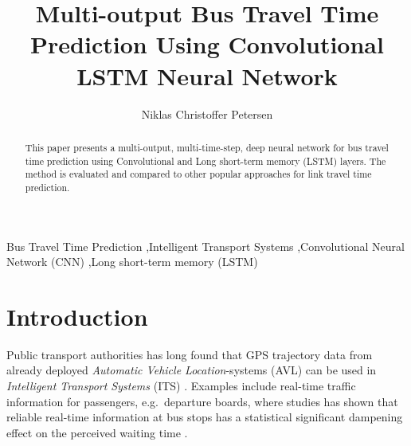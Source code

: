 \documentclass[preprint,12pt]{elsarticle}
\begin{document}
\begin{frontmatter}



\title{Multi-output Bus Travel Time Prediction Using Convolutional LSTM Neural Network}



\author{Niklas Christoffer Petersen}

\address{
  Department of Management Engineering \\
  Technical University of Denmark, 2800 Kongens Lyngby \\
  niklch@dtu.dk
}

\begin{abstract}
This paper presents a multi-output, multi-time-step, deep neural network for bus travel time prediction using Convolutional and Long short-term memory (LSTM) layers. The method is evaluated and compared to other popular approaches for link travel time prediction.
\end{abstract}

\begin{keyword}
Bus Travel Time Prediction \sep Intelligent Transport Systems \sep Convolutional Neural Network (CNN) \sep Long short-term memory (LSTM)
\end{keyword}

\end{frontmatter}
\linenumbers
\section{Introduction}
Public transport authorities has long found that GPS trajectory data from already deployed \emph{Automatic Vehicle Location}-systems (AVL) can be used in \emph{Intelligent Transport Systems} (ITS) \cite{Tcrp48}. Examples include real-time traffic information for passengers, e.g.\ departure boards, where studies has shown that reliable real-time information at bus stops has a statistical significant dampening effect on the perceived waiting time \cite{Fan2016}.
\end{document}
